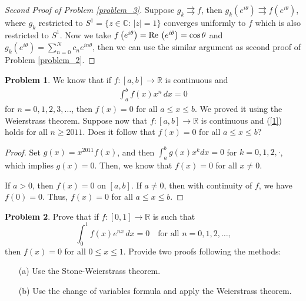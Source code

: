 \documentclass[11pt]{article}
\theoremstyle{definition}
\newtheorem{problem}{Problem}
\theoremstyle{definition}
\begin{document}
\medskip

\begin{proof}[Second Proof of Problem \ref{problem_3}]
Suppose $g_k \rightrightarrows f$, then $g_k\left(e^{i\theta}\right) \rightrightarrows f\left(e^{i\theta}\right)$, where $g_k$ restricted to $S^1 = \{ z\in\mathbb{C}:\, |z|=1\}$ converges uniformly to $f$ which is also restricted to $S^1$. Now we take $f\left(e^{i\theta}\right) = {\rm Re}\,\left(e^{i\theta}\right) = \cos \theta$ and $g_k\left(e^{i\theta}\right) = \sum^N_{n=0}c_n e^{in\theta}$, then we can use the similar argument as second proof of Problem \ref{problem_2}.
\end{proof}

\medskip

\begin{problem}
We know that if $f:[a,b]\to\mathbb{R}$ is continuous and
\begin{align}\label{1}
    \int_a^b f(x)x^n\, dx = 0
\end{align}
for $n=0,1,2,3,\ldots$, then $f(x)=0$ for all $a\leq x\leq b$.
We proved it using the Weierstrass theorem.
Suppose now that $f:[a,b]\to\mathbb{R}$ is continuous and (\ref{1})
holds for all $n\geq 2011$. Does it follow that
$f(x)=0$ for all $a\leq x\leq b$?
\end{problem}
\begin{proof}
Set $g(x) = x^{2011}f(x)$, and then $\int^b_a g(x)x^k dx = 0$ for $k = 0,1,2,\cdot$, which implies $g(x) = 0$. Then, we know that $f(x) = 0$ for all $x\neq 0$.

If $a > 0$, then $f(x) = 0$ on $[a,b]$. If $a\neq 0$, then with continuity of $f$, we have $f(0) = 0$. Thus, $f(x) = 0$ for all $a\leq x\leq b$.
\end{proof}

\medskip

\begin{problem}
Prove that if $f:[0,1]\to\mathbb{R}$ is such that
$$
\int_0^1 f(x) e^{nx}\, dx = 0
\quad
\mbox{for all $n=0,1,2,\ldots$,}
$$
then $f(x)=0$ for all $0\leq x\leq 1$.
Provide two proofs following the methods:
\begin{enumerate}
    \item[(a)] Use the Stone-Weierstrass theorem.
    \item[(b)] Use the change of variables formula and apply
the Weierstrass theorem.
\end{enumerate}
\end{problem}
\end{document}
